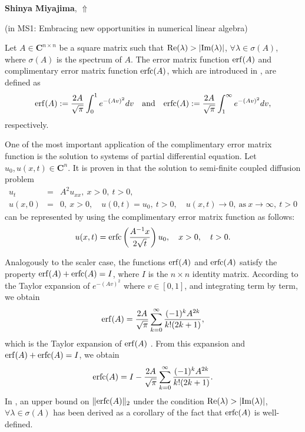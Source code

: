 \documentclass[ILAS2025-program.tex]{subfiles}
\begin{document}
\hypertarget{down0347}{}\begin{ilasabstract}
    
\textbf{Shinya Miyajima},  \hfill \hyperlink{up0347}{$\Uparrow$}
    
    
(in {\color{mstitle}MS1: Embracing new opportunities in numerical linear algebra})
        
\mtskip
    \begin{bibunit}
        Let $A \in \mathbf{C}^{n \times n}$ be a square matrix such that ${\rm Re}(\lambda) > |{\rm Im}(\lambda)|$, $\forall \lambda \in \sigma(A)$, where $\sigma(A)$ is the spectrum of $A$. 
The error matrix function ${\rm erf}(A)$ and complimentary error matrix function ${\rm erfc}(A)$, which are introduced in \cite{Cortes}, are defined as 
$$
{\rm erf}(A) := \frac{2A}{\sqrt{\pi}}\int_{0}^{1} e^{-(Av)^{2}} dv \quad \text{and} \quad {\rm erfc}(A) := \frac{2A}{\sqrt{\pi}}\int_{1}^{\infty} e^{-(Av)^{2}} dv,
$$
respectively. 

One of the most important application of the complimentary error matrix function is the solution to systems of partial differential equation. 
Let $u_0, u(x,t) \in \mathbf{C}^n$. 
It is proven in \cite{Cortes} that the solution to semi-finite coupled diffusion problem 
\begin{eqnarray*}
u_{t} &=& A^2u_{xx}, \ x>0, \ t>0, \\
u(x,0) &=& 0, \ x>0, \quad 
u(0,t) = u_{0}, \ t>0, \quad 
u(x,t) \to 0, \ \textrm{as} \ x\rightarrow\infty, \ t > 0
\end{eqnarray*}
can be represented by using the complimentary error matrix function as follows:
$$
u(x,t) = {\rm erfc}\left(\frac{A^{-1}x}{2\sqrt{t}}\right)u_{0}, \quad x>0, \quad t>0. 
$$

Analogously to the scaler case, the functions ${\rm erf}(A)$ and ${\rm erfc}(A)$ satisfy the property ${\rm erf}(A) + {\rm erfc}(A) = I$, where $I$ is the $n \times n$ identity matrix. 
According to the Taylor expansion of $e^{-(Av)^{2}}$ where $v \in [0,1]$, and integrating term by term, we obtain 
$$
{\rm erf}(A) = \frac{2A}{\sqrt{\pi}}\sum_{k=0}^{\infty}\frac{(-1)^k A^{2k}}{k! (2k+1)}, 
$$
which is the Taylor expansion of ${\rm erf}(A)$ \cite{Cortes}. 
From this expansion and ${\rm erf}(A) + {\rm erfc}(A) = I$, we obtain 
$$
{\rm erfc}(A) = I - \frac{2A}{\sqrt{\pi}}\sum_{k=0}^{\infty}\frac{(-1)^k A^{2k}}{k! (2k+1)}. 
$$
In \cite{Cortes}, an upper bound on $\|{\rm erfc}(A)\|_2$ under the condition ${\rm Re}(\lambda) > |{\rm Im}(\lambda)|$, $\forall \lambda \in \sigma(A)$ has been derived as a corollary of the fact that ${\rm erfc}(A)$ is well-defined. 


\end{bibunit}
\end{ilasabstract}
\end{document}
